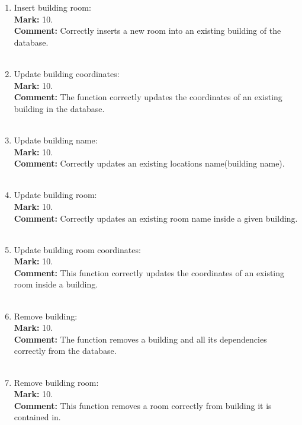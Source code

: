 \documentclass{article}
\begin{document}
\begin{enumerate}
    \item Insert building room:\\
    \textbf{Mark: }
    10.\\
    \textbf{Comment:}
    Correctly inserts a new room into an existing building of the database.\\ \\
    
    \item Update building coordinates:\\
    \textbf{Mark: }
    10.\\
    \textbf{Comment:}
    The function correctly updates the coordinates of an existing building in the database.\\ \\
    
    \item Update building name:\\
    \textbf{Mark: }
    10.\\
    \textbf{Comment:}
    Correctly updates an existing locations name(building name).\\ \\
    
    \item Update building room:\\
    \textbf{Mark: }
    10.\\
    \textbf{Comment:}
    Correctly updates an existing room name inside a given building.\\ \\
    
    \item Update building room coordinates:\\
    \textbf{Mark: }
    10.\\
    \textbf{Comment:}
    This function correctly updates the coordinates of an existing room inside a building.\\ \\
    
    \item Remove building:\\
    \textbf{Mark: }
    10.\\
    \textbf{Comment:}
    The function removes a building and all its dependencies correctly from the database.\\ \\
    
    \item Remove building room:\\
    \textbf{Mark: }
    10.\\
    \textbf{Comment:}
    This function removes a room correctly from building it is contained in.\\ \\
\end{enumerate}
\end{document}
